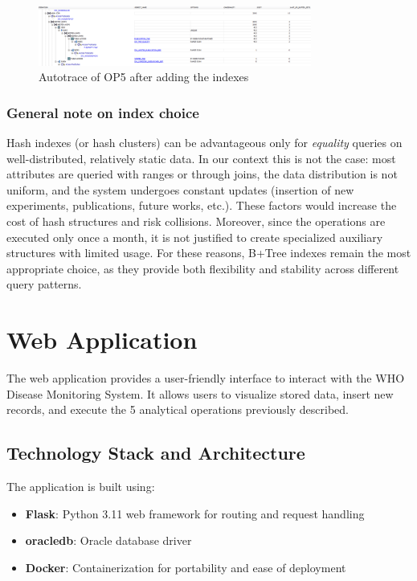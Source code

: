 \documentclass[11pt,a4paper]{article}
\begin{document}
\begin{figure}[H]
  \centering
  \includegraphics[width=0.8\textwidth]{img/op5_autotrace_after.png}
  \caption{Autotrace of OP5 after adding the indexes}
\end{figure}

\subsubsection*{General note on index choice}

Hash indexes (or hash clusters) can be advantageous only for \emph{equality} queries on well-distributed, relatively static data. In our context this is not the case: most attributes are queried with ranges or through joins, the data distribution is not uniform, and the system undergoes constant updates (insertion of new experiments, publications, future works, etc.). These factors would increase the cost of hash structures and risk collisions. Moreover, since the operations are executed only once a month, it is not justified to create specialized auxiliary structures with limited usage. For these reasons, B+Tree indexes remain the most appropriate choice, as they provide both flexibility and stability across different query patterns.

\section{Web Application}

The web application provides a user-friendly interface to interact with the WHO Disease Monitoring System. It allows users to visualize stored data, insert new records, and execute the 5 analytical operations previously described.

\subsection{Technology Stack and Architecture}

The application is built using:
\begin{itemize}
    \item \textbf{Flask}: Python 3.11 web framework for routing and request handling
    \item \textbf{oracledb}: Oracle database driver
    \item \textbf{Docker}: Containerization for portability and ease of deployment
\end{itemize}
\end{document}
